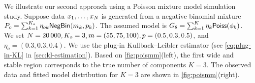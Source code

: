 \begin{example}
	We illustrate our second approach using a Poisson mixture model simulation study.
	Suppose data $x_1, \ldots, x_{N}$ is generated from a negative binomial mixture
	$P_o = \sum_{k=1}^{K_o} \eta_{ok}{\sf{NegBin}}(m_k, p_k)$. %
	The assumed model is $G_{\theta} = \sum_{k=1}^{K} \eta_k {\sf{Poiss}}(\phi_k)$.
	We set $N=20\,000, K_o = 3, m = (55, 75, 100), p = (0.5, 0.3, 0.5)$, and  $\eta_o = (0.3, 0.3, 0.4)$.
	We use the plug-in Kullback--Leibler estimator (see \cref{eq:plug-in-KL} in \cref{sec:kl-estimation}).
	Based on \cref{fig:poismm}(left), the first wide and stable region corresponds to the true number of components $K = 3$.
	The observed data and fitted model distribution for $K = 3$ are shown in \cref{fig:poismm}(right).
\end{example}

